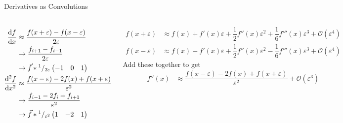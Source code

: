 \begin{frame}{Derivatives as Convolutions}
%
\begin{columns}
\small
\begin{align*}
	\dv{f}{x}%
&\approx
	\dfrac
		{f(x + \varepsilon) - f(x - \varepsilon)}
		{2\varepsilon}
	\\
&\to
	\dfrac
		{f_{i+1} - f_{i-1}}
		{2\varepsilon}
	\\
&\to
	\vec{f} \ast {}^{1}/_{2\varepsilon}
	\begin{pmatrix}
	-1 & 0 & 1
	\end{pmatrix}
\\
	\dv[2]{f}{x}
&\approx
	\dfrac
		{f(x - \varepsilon) -2 f(x) + f(x + \varepsilon)}
		{\varepsilon^2}
	\\
&\to
	\dfrac
		{f_{i-1} - 2 f_i + f_{i+1}}
		{\varepsilon^2}
	\\
&\to
	\vec{f} \ast {}^{1}/_{\varepsilon^2}
	\begin{pmatrix}
	1 & -2 & 1
	\end{pmatrix}
\end{align*}
%
\begin{defbox}[2$^{nd}$ Derivative -- Proof, leftupper=1mm]
\scriptsize
\begin{align*}
f(x + \varepsilon) &\approx
	f(x) + f'(x)\varepsilon + \dfrac{1}{2}f''(x)\varepsilon^2 + \dfrac{1}{6}f'''(x)\varepsilon^3 + \mathcal{O}(\varepsilon^4)
\\
f(x - \varepsilon) &\approx
	f(x) - f'(x)\varepsilon + \dfrac{1}{2}f''(x)\varepsilon^2 - \dfrac{1}{6}f'''(x)\varepsilon^3 + \mathcal{O}(\varepsilon^4)
\end{align*}
Add these together to get
\begin{align*}
f''(x) &\approx
	\dfrac
		{f(x - \varepsilon) - 2f(x) + f(x + \varepsilon)}
		{\varepsilon^2}
	+ \mathcal{O}(\varepsilon^3)
\end{align*}
\end{defbox}
\end{columns}
%
\end{frame}



